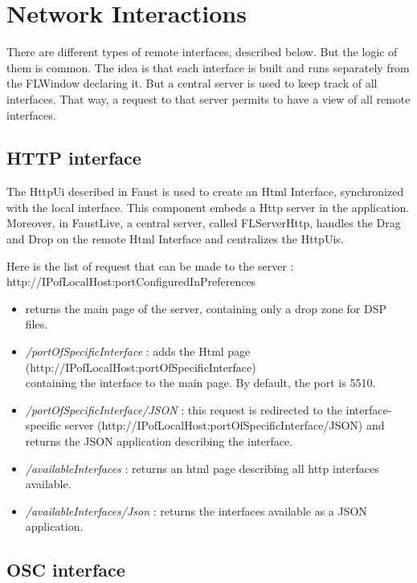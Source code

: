 \documentclass[a4paper]{article}
\begin{document}
\section{Network Interactions}

There are different types of remote interfaces, described below. But the logic of them is common. The idea is that each interface is built and runs separately from the FLWindow declaring it. But a central server is used to keep track of all interfaces. That way, a request to that server permits to have a view of all remote interfaces. 

\subsection{HTTP interface}
The HttpUi described in Faust is used to create an Html Interface, synchronized with the local interface. This component embeds a Http server in the application. \\
Moreover, in FaustLive, a central server, called FLServerHttp, handles the Drag and Drop on the remote Html Interface and centralizes the HttpUis. 

Here is the list of request that can be made to the server :\\
http://IPofLocalHost:portConfiguredInPreferences
\begin{itemize}
\item returns the main page of the server, containing only a drop zone for DSP files.
\item {\it /portOfSpecificInterface} : adds the Html page \\(http://IPofLocalHost:portOfSpecificInterface)\\ containing the interface to the main page. By default, the port is 5510. 
\item {\it /portOfSpecificInterface/JSON} : this request is redirected to the interface-specific server (http://IPofLocalHost:portOfSpecificInterface/JSON) and returns the JSON application describing the interface.
\item {\it /availableInterfaces} : returns an html page describing all http interfaces available.
\item {\it /availableInterfaces/Json} : returns the interfaces available as a JSON application.
\end{itemize}

\subsection{OSC interface}
\end{document}
